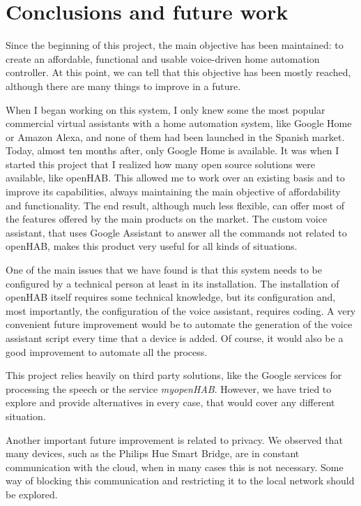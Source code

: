\chapter{Conclusions and future work}

Since the beginning of this project, the main objective has been maintained: to create an affordable, functional and usable voice-driven
home automation controller. At this point, we can tell that this objective has been mostly reached, although there are many things
to improve in a future.

When I began working on this system, I only knew some the most popular commercial virtual assistants with a home automation system,
like Google Home or Amazon Alexa, and none of them had been launched in the Spanish market. Today, almost ten months after, only
Google Home is available. It was when I started this project that I realized how many open source solutions were available, like openHAB.
This allowed me to work over an existing basis and to improve its capabilities, always maintaining the main objective of affordability
and functionality. The end result, although much less flexible, can offer most of the features offered by the main products on the
market. The custom voice assistant, that uses Google Assistant to answer all the commands not related to openHAB, makes this product
very useful for all kinds of situations.

One of the main issues that we have found is that this system needs to be configured by a technical person at least in its installation.
The installation of openHAB itself requires some technical knowledge, but its configuration and, most importantly, the configuration
of the voice assistant, requires coding. A very convenient future improvement would be to automate the generation of the voice
assistant script every time that a device is added. Of course, it would also be a good improvement to automate all the process.

This project relies heavily on third party solutions, like the Google services for processing the speech or the service
\textit{myopenHAB}. However, we have tried to explore and provide alternatives in every case, that would cover any different situation.

Another important future improvement is related to privacy. We observed that many devices, such as the Philips Hue Smart Bridge,
are in constant communication with the cloud, when in many cases this is not necessary. Some way of blocking this communication
and restricting it to the local network should be explored.

